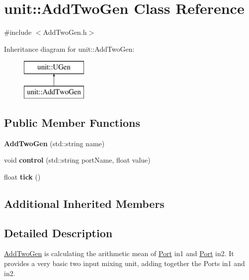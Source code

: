 \hypertarget{classunit_1_1AddTwoGen}{}\section{unit\+:\+:Add\+Two\+Gen Class Reference}
\label{classunit_1_1AddTwoGen}


{\ttfamily \#include $<$Add\+Two\+Gen.\+h$>$}

Inheritance diagram for unit\+:\+:Add\+Two\+Gen\+:\begin{figure}[H]
\begin{center}
\leavevmode
\includegraphics[height=2.000000cm]{classunit_1_1AddTwoGen}
\end{center}
\end{figure}
\subsection*{Public Member Functions}
\begin{DoxyCompactItemize}
\item 
{\bfseries Add\+Two\+Gen} (std\+::string name)\hypertarget{classunit_1_1AddTwoGen_a6feb4da948f12b37eb4502899b5a4311}{}\label{classunit_1_1AddTwoGen_a6feb4da948f12b37eb4502899b5a4311}

\item 
void {\bfseries control} (std\+::string port\+Name, float value)\hypertarget{classunit_1_1AddTwoGen_a5e0a82722566595b7284386a618ef3cb}{}\label{classunit_1_1AddTwoGen_a5e0a82722566595b7284386a618ef3cb}

\item 
float {\bfseries tick} ()\hypertarget{classunit_1_1AddTwoGen_a8e667f4f6c6849faef9f07a62e779d9a}{}\label{classunit_1_1AddTwoGen_a8e667f4f6c6849faef9f07a62e779d9a}

\end{DoxyCompactItemize}
\subsection*{Additional Inherited Members}


\subsection{Detailed Description}
\hyperlink{classunit_1_1AddTwoGen}{Add\+Two\+Gen} is calculating the arithmetic mean of \hyperlink{classPort}{Port} in1 and \hyperlink{classPort}{Port} in2. It provides a very basic two input mixing unit, adding together the Ports in1 and in2.

